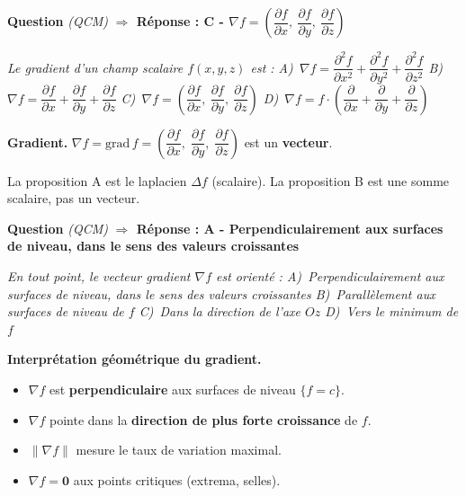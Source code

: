\documentclass[11pt,a4paper]{article}
\newcounter{qnum}
\newcommand{\qtitre}[2]{%
  \stepcounter{qnum}%
  \medskip\noindent
  \textbf{\color{bleutexte}Question \theqnum}\enspace
  \textit{(#1)}\enspace
  \textcolor{vertok}{\textbf{$\Rightarrow$ Réponse : #2}}
  \par\smallskip
}
\newcommand{\qenonce}[1]{%
  \begin{mdframed}[backgroundcolor=grisbox, linewidth=0pt,
    innerleftmargin=8pt, innerrightmargin=8pt,
    innertopmargin=5pt, innerbottommargin=5pt,
    skipabove=2pt, skipbelow=4pt]
  \small\textit{#1}
  \end{mdframed}
}
\begin{document}
\qtitre{QCM}{C - $\nabla f = \left(\dfrac{\partial f}{\partial x},\ \dfrac{\partial f}{\partial y},\ \dfrac{\partial f}{\partial z}\right)$}
\qenonce{Le gradient d'un champ scalaire $f(x,y,z)$ est :
\quad A)~$\nabla f = \dfrac{\partial^2 f}{\partial x^2} + \dfrac{\partial^2 f}{\partial y^2} + \dfrac{\partial^2 f}{\partial z^2}$
\quad B)~$\nabla f = \dfrac{\partial f}{\partial x} + \dfrac{\partial f}{\partial y} + \dfrac{\partial f}{\partial z}$
\quad C)~$\nabla f = \left(\dfrac{\partial f}{\partial x},\ \dfrac{\partial f}{\partial y},\ \dfrac{\partial f}{\partial z}\right)$
\quad D)~$\nabla f = f\cdot\left(\dfrac{\partial}{\partial x} + \dfrac{\partial}{\partial y} + \dfrac{\partial}{\partial z}\right)$}

\begin{methodebox}
\textbf{Gradient.} $\nabla f = \mathrm{grad}\,f = \left(\dfrac{\partial f}{\partial x},\;\dfrac{\partial f}{\partial y},\;\dfrac{\partial f}{\partial z}\right)$ est un \textbf{vecteur}.

La proposition A est le laplacien $\Delta f$ (scalaire). La proposition B est une somme scalaire, pas un vecteur.
\end{methodebox}

\qtitre{QCM}{A - Perpendiculairement aux surfaces de niveau, dans le sens des valeurs croissantes}
\qenonce{En tout point, le vecteur gradient $\nabla f$ est orienté :
\quad A)~Perpendiculairement aux surfaces de niveau, dans le sens des valeurs croissantes
\quad B)~Parallèlement aux surfaces de niveau de $f$
\quad C)~Dans la direction de l'axe $Oz$
\quad D)~Vers le minimum de $f$}

\begin{methodebox}
\textbf{Interprétation géométrique du gradient.}
\begin{itemize}[itemsep=1pt, topsep=2pt]
  \item $\nabla f$ est \textbf{perpendiculaire} aux surfaces de niveau $\{f = c\}$.
  \item $\nabla f$ pointe dans la \textbf{direction de plus forte croissance} de $f$.
  \item $\|\nabla f\|$ mesure le taux de variation maximal.
  \item $\nabla f = \mathbf{0}$ aux points critiques (extrema, selles).
\end{itemize}
\end{methodebox}
\end{document}
